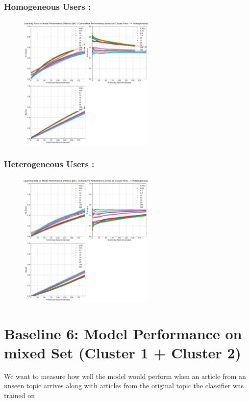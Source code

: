 \documentclass[a4paper,fontsize=8.0pt]{scrartcl}
\begin{document}
\subsubsection{Homogeneous Users :}
\begin{figure}[H]
 \includegraphics[width=0.6\textwidth]{Graphs/BERT/lr_vs_model_performance_cumu_Homogeneous.pdf}
\end{figure}
\subsubsection{Heterogeneous Users :}
\begin{figure}[H]
 \includegraphics[width=0.6\textwidth]{Graphs/BERT/lr_vs_model_performance_cumu_Heterogeneous.pdf}
\end{figure}

\newpage
\section{Baseline 6: Model Performance on mixed Set (Cluster 1 + Cluster 2)}
\begin{flushleft}
We want to measure how well the model would perform when an article from an unseen topic arrives along with articles from the original topic the classifier was trained on
\end{flushleft}
\end{document}
